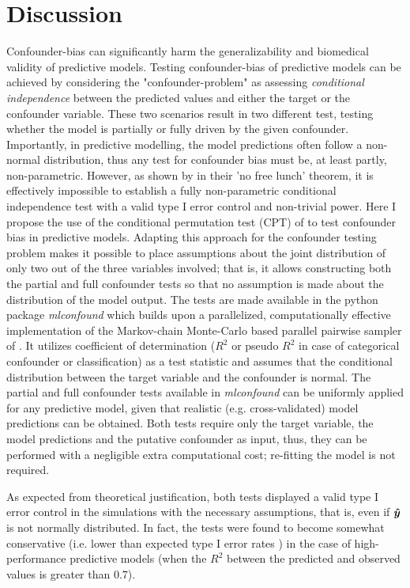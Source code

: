 \documentclass{article}
\begin{document}
\section{Discussion}

Confounder-bias can significantly harm the generalizability and biomedical validity of predictive models. Testing confounder-bias of predictive models can be achieved by considering the "confounder-problem" as assessing \emph{conditional independence} between the predicted values and either the target or the confounder variable. These two scenarios result in two different test, testing whether the model is partially or fully driven by the given confounder.
Importantly, in predictive modelling, the model predictions often follow a non-normal distribution, thus any test for confounder bias must be, at least partly, non-parametric.
However, as shown by \citet{shah2020hardness} in their 'no free lunch' theorem, it is effectively impossible to establish a fully non-parametric conditional independence test with a valid type I error control and non-trivial power.
Here I propose the use of the conditional permutation test (CPT) of \cite{berrett2020conditional} to test confounder bias in predictive models. Adapting this approach for the confounder testing problem makes it possible to place assumptions about the joint distribution of only two out of the three variables involved; that is, it allows constructing both the partial and full confounder tests so that no assumption is made about the distribution of the model output. 
The tests are made available in the python package \emph{mlconfound} which builds upon a parallelized, computationally effective implementation of the Markov-chain Monte-Carlo based parallel pairwise sampler of \cite{berrett2020conditional}. It utilizes coefficient of determination ($R^2$ or pseudo $R^2$ in case of categorical confounder or classification) as a test statistic and assumes that the conditional distribution between the target variable and the confounder is normal. The partial and full confounder tests available in \emph{mlconfound} can be uniformly applied for any predictive model, given that realistic (e.g. cross-validated) model predictions can be obtained. Both tests require only the target variable, the model predictions and the putative confounder as input, thus, they can be performed with a negligible extra computational cost; re-fitting the model is not required.

As expected from theoretical justification, both tests displayed a valid type I error control in the simulations with the necessary assumptions, that is, even if $\boldsymbol{\hat{y}}$ is not normally distributed. In fact, the tests were found to become somewhat conservative (i.e. lower than expected type I error rates ) in the case of high-performance predictive models (when the $R^2$ between the predicted and observed values is greater than 0.7). 
\end{document}
